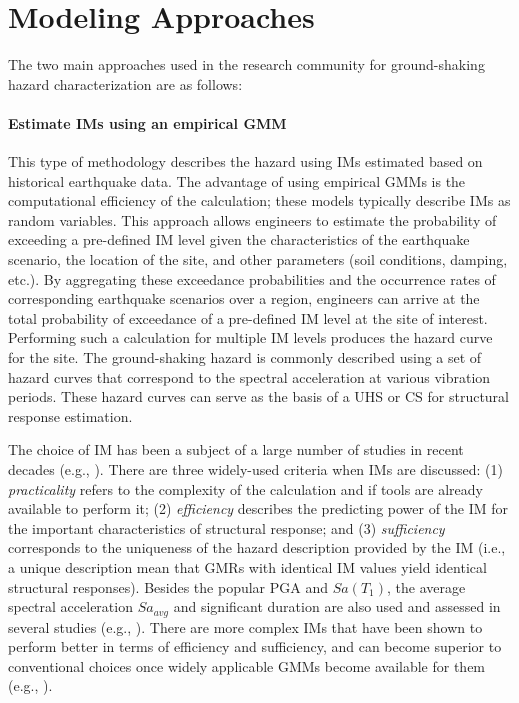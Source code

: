 \section{Modeling Approaches}
\label{sec:eq_shake_models}

The two main approaches used in the research community for ground-shaking hazard characterization are as follows:

\paragraph{Estimate IMs using an empirical GMM} This type of methodology describes the hazard using IMs estimated based on historical earthquake data. The advantage of using empirical GMMs is the computational efficiency of the calculation; these models typically describe IMs as random variables. This approach allows engineers to estimate the probability of exceeding a pre-defined IM level given the characteristics of the earthquake scenario, the location of the site, and other parameters (soil conditions, damping, etc.). By aggregating these exceedance probabilities and the occurrence rates of corresponding earthquake scenarios over a region, engineers can arrive at the total probability of exceedance of a pre-defined IM level at the site of interest. Performing such a calculation for multiple IM levels produces the hazard curve for the site. The ground-shaking hazard is commonly described using a set of hazard curves that correspond to the spectral acceleration at various vibration periods. These hazard curves can serve as the basis of a UHS or CS for structural response estimation.

The choice of IM has been a subject of a large number of studies in recent decades (e.g., \cite{shome1998earthquakes, luco2007structure}). There are three widely-used criteria when IMs are discussed: (1) \emph{practicality} refers to the complexity of the calculation and if tools are already available to perform it; (2) \emph{efficiency} describes the predicting power of the IM for the important characteristics of structural response; and (3) \emph{sufficiency} corresponds to the uniqueness of the hazard description provided by the IM (i.e., a unique description mean that GMRs with identical IM values yield identical structural responses). Besides the popular PGA and $Sa(T_1)$, the average spectral acceleration $Sa_{avg}$ and significant duration are also used and assessed in several studies (e.g., \cite{bijelic2018validation}). There are more complex IMs that have been shown to perform better in terms of efficiency and sufficiency, and can become superior to conventional choices once widely applicable GMMs become available for them (e.g., \cite{davalos2019filtered}). 

